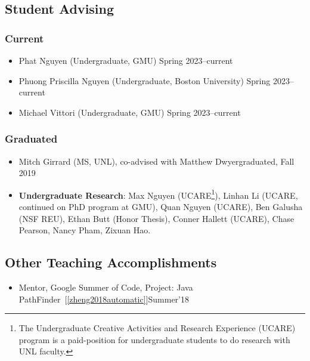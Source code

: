 \documentclass[11pt]{article}
\begin{document}
{
  \subsection{Student Advising}
  
  \subsubsection{Current}
  \begin{itemize}
    \haiduong{}    
    \didier{}
    \linhan{}
    \item Phat Nguyen (Undergraduate, GMU) \hfill Spring 2023--current
    \item Phuong Priscilla Nguyen (Undergraduate, Boston University) \hfill Spring 2023--current
    \item Michael Vittori (Undergraduate, GMU) \hfill Spring 2023--current
  \end{itemize}

  \subsubsection{Graduated}
  \begin{itemize}
    \kimhao{}
    \guolong{}
    \alex{}
  \item Mitch Girrard (MS, UNL), co-advised with Matthew Dwyer\hfill graduated, Fall 2019
    
    \item \textbf{Undergraduate Research}: Max Nguyen (UCARE\footnote{The Undergraduate Creative Activities and Research Experience (UCARE) program is a paid-position for undergraduate students to do research with UNL faculty.}), Linhan Li (UCARE, continued on PhD program at GMU), Quan Nguyen (UCARE), Ben Galusha (NSF REU), Ethan Butt (Honor Thesis), Conner Hallett (UCARE), Chase Pearson, Nancy Pham, Zixuan Hao.
  \end{itemize}
}

\subsection{Other Teaching Accomplishments}
\begin{itemize}
\item Mentor, Google Summer of Code, Project: Java PathFinder~[\ref{zheng2018automatic}]\hfill Summer'18
\end{itemize}
\end{document}
